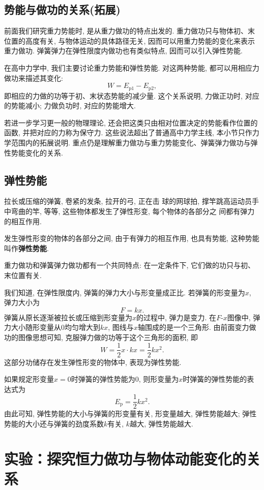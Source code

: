 \documentclass[11pt,a4paper]{ctexbook}
\begin{document}
\subsection{势能与做功的关系(拓展)}
前面我们研究重力势能时, 是从重力做功的特点出发的. 重力做功只与物体初、末位置的高度有关, 与物体运动的具体路径无关, 因而可以用重力势能的变化来表示重力做功. 弹簧弹力在弹性限度内做功也有类似特点, 因而可以引入弹性势能.

在高中力学中, 我们主要讨论重力势能和弹性势能. 对这两种势能, 都可以用相应力做功来描述其变化:
$$W=E_{\text{p}1}-E_{\text{p}2},$$
即相应的力做的功等于初、末状态势能的减少量. 这个关系说明, 力做正功时, 对应的势能减小; 力做负功时, 对应的势能增大.

若进一步学习更一般的物理理论, 还会把这类只由相对位置决定的势能看作位置的函数, 并把对应的力称为保守力. 这些说法超出了普通高中力学主线, 本小节只作力学范围内的拓展说明. 重点仍是理解重力做功与重力势能变化、弹簧弹力做功与弹性势能变化的关系.

\subsection{弹性势能}
拉长或压缩的弹簧, 卷紧的发条, 拉开的弓, 正在击
球的网球拍, 撑竿跳高运动员手中弯曲的竿,
等等, 这些物体都发生了弹性形变, 每个物体的各部分之
间都有弹力的相互作用.

发生弹性形变的物体的各部分之间, 由于有弹力的相互作用, 也具有势能, 这种势能
叫作\textbf{弹性势能}.

重力做功和弹簧弹力做功都有一个共同特点: 在一定条件下, 它们做的功只与初、末位置有关.

我们知道, 在弹性限度内, 弹簧的弹力大小与形变量成正比. 若弹簧的形变量为$x$, 弹力大小为
$$F=kx.$$
弹簧从原长逐渐被拉长或压缩到形变量为$x$的过程中, 弹力是变力. 在$F$-$x$图像中, 弹力大小随形变量从0均匀增大到$kx$, 图线与$x$轴围成的是一个三角形. 由前面变力做功的图像思想可知, 克服弹力做的功等于这个三角形的面积, 即
$$W=\frac12 x\cdot kx=\frac12kx^2.$$
这部分功储存在发生弹性形变的物体中, 表现为弹性势能.

如果规定形变量$x = 0$时弹簧的弹性势能为0, 则形变量为$x$时弹簧的弹性势能的表达式为
$$E_\mathrm{p} = \frac12 k x^2.$$
由此可知, 弹性势能的大小与弹簧的形变量有关, 形变量越大, 弹性势能越大; 弹性势能的大小还与弹簧的劲度系数$k$有关,
$k$越大, 弹性势能越大.



\section{实验：探究恒力做功与物体动能变化的关系}
\end{document}

